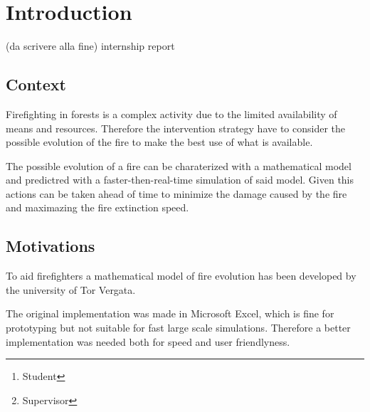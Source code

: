 \documentclass[draft]{article}
\title{\mytitle}
\date{2021}
\author{Diego Bellani\thanks{Student}\and Enrico Tronci\thanks{Supervisor}}
\begin{document}
\begin{titlepage}
	\maketitle

	\begin{abstract}
	(Max one page, da scrivere alla fine)
	\end{abstract}

	\tableofcontents
	\iffalse
	\listoffigures
	\listoftables
	\fi
\end{titlepage}


\section{Introduction}\label{sec:intro}

(da scrivere alla fine) internship report

\subsection{Context}\label{sec:context}

Firefighting in forests is a complex activity due to the limited availability of
means and resources. Therefore the intervention strategy have to consider the
possible evolution of the fire to make the best use of what is available.

The possible evolution of a fire can be charaterized with a mathematical model
and predictred with a faster-then-real-time simulation of said model. Given this
actions can be taken ahead of time to minimize the damage caused by the fire and
maximazing the fire extinction speed.

\subsection{Motivations}\label{sec:motivations}

To aid firefighters a mathematical model of fire evolution has been developed by
the university of Tor Vergata.

The original implementation was made in Microsoft
Excel\textsuperscript{\textregistered}, which is fine for prototyping but not
suitable for fast large scale simulations. Therefore a better implementation was
needed both for speed and user friendlyness.
\end{document}
